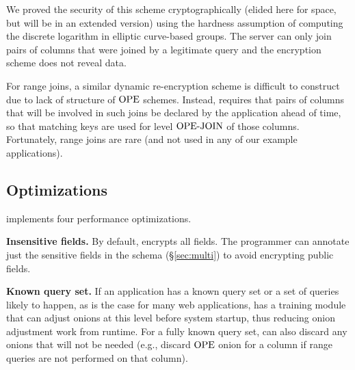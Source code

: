 We proved the security of this scheme cryptographically (elided here
for space, but will be in an extended version) using the hardness
assumption of computing the discrete logarithm in elliptic curve-based
groups. The server can only join pairs of columns that were joined by
a legitimate query and the encryption scheme does not reveal data.


For range joins, a similar dynamic re-encryption scheme is difficult
to construct due to lack of structure of $\textrm{OPE}$ schemes.  Instead,
\name{} requires that pairs of columns that will be involved in such
joins be declared by the application ahead of time, so that matching
keys are used for level $\textrm{OPE-JOIN}$ of those columns.  Fortunately,
range joins are rare (and not used in any of our example
applications).

\subsection{Optimizations}
\label{ss:optimize}

\name{} implements four performance optimizations.

\textbf{Insensitive fields.} By default, \name{} encrypts all fields. 
The programmer can annotate just the sensitive fields in the schema
(\S\ref{sec:multi}) to avoid encrypting public fields.

\textbf{Known query set.}  If an application has a known query set or a set of queries likely to happen, as is the case for many web applications, \name{} has a training module that can adjust onions at this level before system startup, thus reducing onion adjustment work from runtime. For a fully known query set, \name{} can also discard any onions that will not be needed (e.g., discard $\textrm{OPE}$ onion for a column if range queries are not performed on that column).

